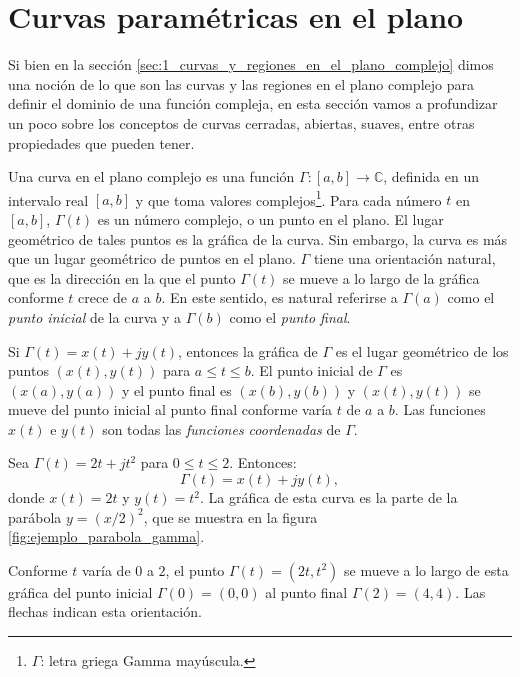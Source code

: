 \section{Curvas paramétricas en el plano}

Si bien en la sección \ref{sec:1_curvas_y_regiones_en_el_plano_complejo} dimos una noción de lo que son las curvas y las regiones en el plano complejo para definir el dominio de una función compleja, en esta sección vamos a profundizar un poco sobre los conceptos de curvas cerradas, abiertas, suaves, entre otras propiedades que pueden tener. 

Una curva en el plano complejo es una función $\Gamma :[a,b]\to\mathbb{C}$, definida en un intervalo real $[a,b]$ y que toma valores complejos\footnote{$\Gamma$: letra griega Gamma mayúscula.}. Para cada número $t$ en $[a,b]$, $\Gamma(t)$ es un número complejo, o un punto en el plano. El lugar geométrico de tales puntos es la gráfica de la curva. Sin embargo, la curva es más que un lugar geométrico de puntos en el plano. $\Gamma$ tiene una orientación natural, que es la dirección en la que el punto $\Gamma(t)$ se mueve a lo largo de la gráfica conforme $t$ crece de $a$ a $b$. En este sentido, es natural referirse a $\Gamma(a)$ como el \textit{punto inicial} de la curva y a $\Gamma(b)$ como el \textit{punto final}.

Si $\Gamma(t)=x(t)+jy(t)$, entonces la gráfica de $\Gamma$ es el lugar geométrico de los puntos $(x(t),y(t))$ para $a\leqslant t\leqslant b$. El punto inicial de $\Gamma$ es $(x(a),y(a))$ y el punto final es $(x(b),y(b))$ y $(x(t),y(t))$ se mueve del punto inicial al punto final conforme varía $t$ de $a$ a $b$. Las funciones $x(t)$ e $y(t)$ son todas las \textit{funciones coordenadas} de $\Gamma$.

\begin{example}
  Sea $\Gamma (t) = 2t + jt^2$ para $0\leqslant t\leqslant 2$. Entonces:
  $$
  \Gamma (t)=x(t)+jy(t),
  $$
  donde $x(t)=2t$ y $y(t)=t^2$. La gráfica de esta curva es la parte de la parábola $y=(x/2)^2$, que se muestra en la figura \ref{fig:ejemplo_parabola_gamma}.
  
  Conforme $t$ varía de $0$ a $2$, el punto $\Gamma (t)=(2t,t^2)$ se mueve a lo largo de esta gráfica del punto inicial $\Gamma(0)=(0,0)$ al punto final $\Gamma(2)=(4,4)$. Las flechas indican esta orientación.
\end{example}

